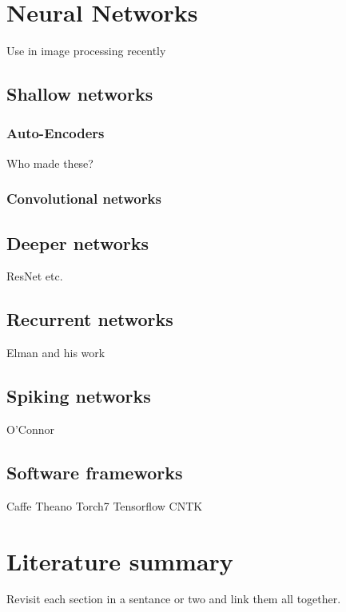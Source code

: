 
\section{Neural Networks}     %
Use in image processing recently

\subsection{Shallow networks}  

\subsubsection{Auto-Encoders}  %
Who made these?

\subsubsection{Convolutional networks}

\subsection{Deeper networks}   %
ResNet etc.

\subsection{Recurrent networks}  %
Elman and his work

\subsection{Spiking networks}    %
O'Connor

\subsection{Software frameworks}   %
Caffe Theano Torch7 Tensorflow CNTK


\section{Literature summary}      %
Revisit each section in a sentance or two and link them all together.



